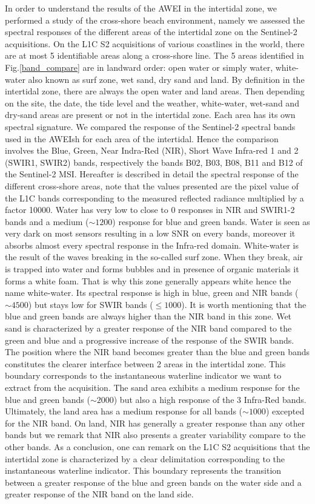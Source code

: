 \documentclass[remotesensing,article,submit,pdftex,moreauthors]{Definitions/mdpi}
\begin{document}
In order to understand the results of the AWEI in the intertidal zone, we performed a study of the cross-shore beach environment, namely we assessed the spectral responses of the different areas of the intertidal zone on the Sentinel-2 acquisitions.
On the L1C S2 acquisitions of various coastlines in the world, there are at most 5 identifiable areas along a cross-shore line.
The 5 areas identified in Fig.\ref{band_compare} are in landward order: open water or simply water, white-water also known as surf zone, wet sand, dry sand and land.
By definition in the intertidal zone, there are always the open water and land areas. 
Then depending on the site, the date, the tide level and the weather, white-water, wet-sand and dry-sand areas are present or not in the intertidal zone.
Each area has its own spectral signature.
We compared the response of the Sentinel-2 spectral bands used in the AWEIsh for each area of the intertidal.
Hence the comparison involves the Blue, Green, Near Indra-Red (NIR), Short Wave Infra-red 1 and 2 (SWIR1, SWIR2) bands, respectively the bands B02, B03, B08, B11 and B12 of the Sentinel-2 MSI.
Hereafter is described in detail the spectral response of the different cross-shore areas, note that the values presented are the pixel value of the L1C bands corresponding to the measured reflected radiance multiplied by a factor 10000.
Water has very low to close to 0 responses in NIR and SWIR1-2 bands and a medium ($\sim 1200$) response for blue and green bands.
Water is seen as very dark on most sensors resulting in a low SNR on every bands, moreover it absorbs almost every spectral response in the Infra-red domain.
White-water is the result of the waves breaking in the so-called surf zone.
When they break, air is trapped into water and forms bubbles and in presence of organic materials it forms a white foam.
That is why this zone generally appears white hence the name white-water.
Its spectral response is high in blue, green and NIR bands ($\sim 4500$) but stays low for SWIR bands ($\le 1000$).
It is worth mentioning that the blue and green bands are always higher than the NIR band in this zone.
Wet sand is characterized by a greater response of the NIR band compared to the green and blue and a progressive increase of the response of the SWIR bands.
The position where the NIR band becomes greater than the blue and green bands constitutes the clearer interface between 2 areas in the intertidal zone. 
This boundary corresponds to the instantaneous waterline indicator we want to extract from the acquisition.
The sand area exhibits a medium response for the blue and green bands ($\sim 2000$) but also a high response of the 3 Infra-Red bands.
Ultimately, the land area has a medium response for all bands ($\sim 1000$) excepted for the NIR band.
On land, NIR has generally a greater response than any other bands but we remark that NIR also presents a greater variability compare to the other bands.
As a conclusion, one can remark on the L1C S2 acquisitions that the intertidal zone is characterized by a clear delimitation corresponding to the instantaneous waterline indicator.
This boundary represents the transition between a greater response of the blue and green bands on the water side and a greater response of the NIR band on the land side.
\end{document}
